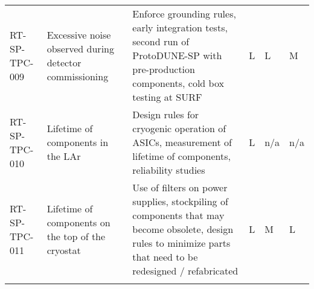 \begin{footnotesize}
\begin{longtable}{P{0.18\textwidth}P{0.20\textwidth}P{0.32\textwidth}P{0.02\textwidth}P{0.02\textwidth}P{0.02\textwidth}}
RT-SP-TPC-009 & Excessive noise observed during detector commissioning & Enforce grounding rules, early integration tests, second run of ProtoDUNE-SP with pre-production components, cold box testing at SURF & L & L & M \\  \colhline
RT-SP-TPC-010 & Lifetime of components in the LAr & Design rules for cryogenic operation of ASICs, measurement of lifetime of components, reliability studies & L & n/a & n/a \\  \colhline
RT-SP-TPC-011 & Lifetime of components on the top of the cryostat & Use of filters on power supplies, stockpiling of components that may become obsolete, design rules to minimize parts that need to be redesigned / refabricated & L & M & L \\  \colhline

\label{tab:risks:SP-FD-TPCELEC}
\end{longtable}
\end{footnotesize}

